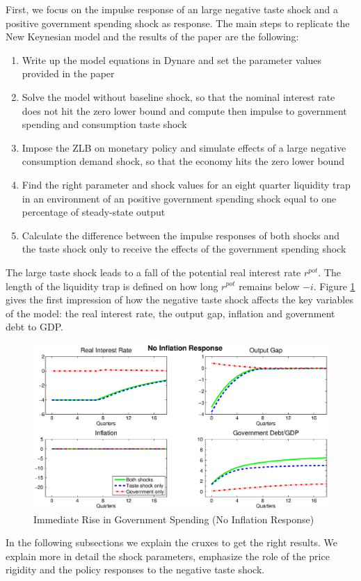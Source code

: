 \documentclass[12pt,a4paper,oneside,titlepage]{article}
\begin{document}
First, we focus on the impulse response of an large negative taste shock and a positive government spending shock as response.
The main steps to replicate the New Keynesian model and the results of the \citet{Erceg.2014} paper are the following:
\begin{enumerate}
\item Write up the model equations in Dynare and set the parameter values provided in the paper\vspace{-0.3cm}
\item Solve the model without baseline shock, so that the nominal interest rate does not hit the zero lower bound and compute then impulse to government spending and consumption taste shock\vspace{-0.3cm}
\item Impose the ZLB on monetary policy and simulate effects of a large negative consumption demand shock, so that the economy hits the zero lower bound\vspace{-0.3cm}
\item Find the right parameter and shock values for an eight quarter liquidity trap in an environment of an positive government spending shock equal to one percentage of steady-state output\vspace{-0.3cm}
\item Calculate the difference between the impulse responses of both shocks and the taste shock only to receive the effects of the government spending shock
\end{enumerate}
The large taste shock leads to a fall of the potential real interest rate $r^{pot}$. The length of the liquidity trap is defined on how long $r^{pot}$ remains below $-i$.
Figure \ref{IRnoinflation} gives the first impression of how the negative taste shock affects the key variables of the model: the real interest rate, the output gap, inflation and government debt to GDP.
\begin{figure}[p]
\includegraphics[width=\textwidth]{Paperpics/Figure2noIR}
\caption{Immediate Rise in Government Spending (No Inflation Response)}
\label{IRnoinflation}
\end{figure}
In the following subsections we explain the cruxes to get the right results. We explain more in detail the shock parameters, emphasize the role of the price rigidity and the policy responses to the negative taste shock.
\end{document}
